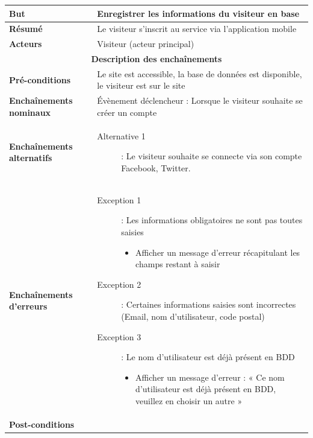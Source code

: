 \documentclass[a4paper,12pt]{report}
\begin{document}
\begin{onehalfspace}
\begin{tabular}{|p{3cm}|p{}|}
\textbf{But} &
Enregistrer les informations du visiteur en base 
\\ \hline %

\textbf{Résumé} &
Le visiteur s'inscrit au service via l'application mobile
\\ \hline %

\textbf{Acteurs} &
Visiteur (acteur principal)
\\ \hline %

\multicolumn{2}{|c|}{\textbf{Description des enchaînements}} \\ \hline %

\textbf{Pré-conditions} &
Le site est accessible, la base de données est disponible, le visiteur est sur le site
\\ \hline %

\textbf{Enchaînements nominaux} &
Évènement déclencheur : Lorsque le visiteur souhaite se créer un compte
\\ \hline %

\textbf{Enchaînements alternatifs} &
    \begin{description}
      \item[Alternative 1]: Le visiteur souhaite se connecte via son compte Facebook, Twitter.
    \end{description}
\\ \hline %

\textbf{Enchaînements d'erreurs} &
  \begin{description}
    \item[Exception 1]: Les informations obligatoires ne sont pas toutes saisies
    \begin{itemize}
      \item Afficher un message d’erreur récapitulant les champs restant à saisir
    \end{itemize}
    \item[Exception 2]: Certaines informations saisies sont incorrectes (Email, nom d’utilisateur, code postal)
    \item[Exception 3]: Le nom d’utilisateur est déjà présent en BDD
    \begin{itemize}
      \item Afficher un message d’erreur : « Ce nom d’utilisateur est déjà présent en BDD, veuillez en choisir un autre »
    \end{itemize}
  \end{description}
\\ \hline %

\textbf{Post-conditions} &
\\ \hline %


\end{tabular}
\end{onehalfspace}
\end{document}
